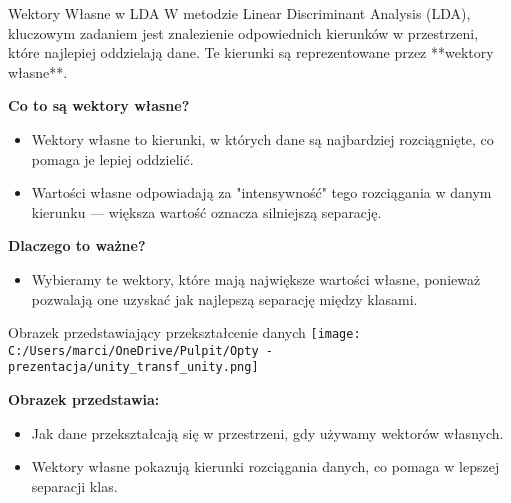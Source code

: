 \documentclass{beamer}
\begin{document}
\begin{frame}{Wektory Własne w LDA}
    W metodzie Linear Discriminant Analysis (LDA), kluczowym zadaniem jest znalezienie odpowiednich kierunków w przestrzeni, które najlepiej oddzielają dane.
    Te kierunki są reprezentowane przez **wektory własne**.

    \bigskip
    \textbf{Co to są wektory własne?}  
    \begin{itemize}
        \item Wektory własne to kierunki, w których dane są najbardziej rozciągnięte, co pomaga je lepiej oddzielić.
        \item Wartości własne odpowiadają za "intensywność" tego rozciągania w danym kierunku — większa wartość oznacza silniejszą separację.
    \end{itemize}

    \bigskip
    \textbf{Dlaczego to ważne?}  
    \begin{itemize}
        \item Wybieramy te wektory, które mają największe wartości własne, ponieważ pozwalają one uzyskać jak najlepszą separację między klasami.
    \end{itemize}
\end{frame}


\begin{frame}{Obrazek przedstawiający przekształcenie danych}
    \texttt{[image: C:/Users/marci/OneDrive/Pulpit/Opty - prezentacja/unity\_transf\_unity.png]}
    
    \bigskip
    \textbf{Obrazek przedstawia:}
    \begin{itemize}
        \item Jak dane przekształcają się w przestrzeni, gdy używamy wektorów własnych.
        \item Wektory własne pokazują kierunki rozciągania danych, co pomaga w lepszej separacji klas.
    \end{itemize}
\end{frame}
\end{document}
